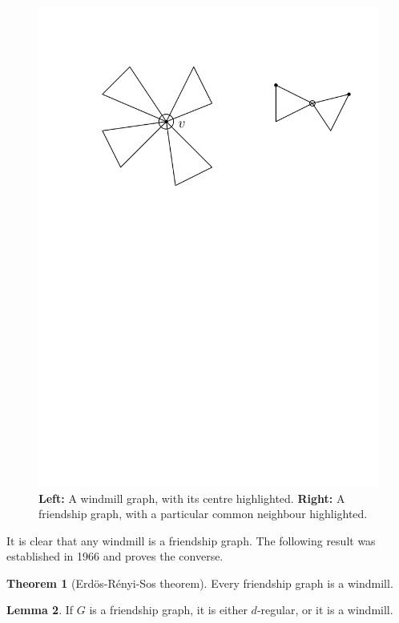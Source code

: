 \documentclass[12pt]{amsart}
\theoremstyle{definition}
\newtheorem{thm}{Theorem}[section]
\newtheorem{lm}[thm]{Lemma}
\begin{document}
\begin{figure}[h]
\includegraphics[scale=.65]{../imgs/friendship_windmil}
\caption{\textbf{Left:} A windmill graph, with its centre highlighted. \textbf{Right:} A friendship graph, with a particular common neighbour highlighted.\label{fig:windmill}}
\end{figure}

It is clear that any windmill is a friendship graph.
The following result was established in 1966 and proves the converse.

\begin{thm}[Erd\"os-R\'enyi-Sos theorem]\label{thm:ERS}
Every friendship graph is a windmill.
\end{thm}


\begin{lm}\label{lm:FWd}
If $G$ is a friendship graph, it is either $d$-regular, or it is a windmill.
\end{lm}
\end{document}
